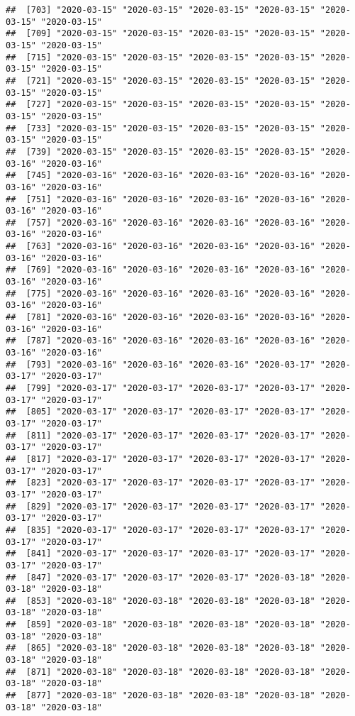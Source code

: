 \documentclass{article}\usepackage[]{graphicx}\usepackage[]{xcolor}
\makeatletter
\newenvironment{kframe}{%
 \def\at@end@of@kframe{}%
 \ifinner\ifhmode%
  \def\at@end@of@kframe{\end{minipage}}%
  \begin{minipage}{\columnwidth}%
 \fi\fi%
 \def\FrameCommand##1{\hskip\@totalleftmargin \hskip-\fboxsep
 \colorbox{shadecolor}{##1}\hskip-\fboxsep
     \hskip-\linewidth \hskip-\@totalleftmargin \hskip\columnwidth}%
 \MakeFramed {\advance\hsize-\width
   \@totalleftmargin\z@ \linewidth\hsize
   \@setminipage}}%
 {\par\unskip\endMakeFramed%
 \at@end@of@kframe}
\newenvironment{knitrout}{}{} %
\makeatother
\begin{document}
\begin{knitrout}
\begin{kframe}
\begin{verbatim}
##  [703] "2020-03-15" "2020-03-15" "2020-03-15" "2020-03-15" "2020-03-15" "2020-03-15"
##  [709] "2020-03-15" "2020-03-15" "2020-03-15" "2020-03-15" "2020-03-15" "2020-03-15"
##  [715] "2020-03-15" "2020-03-15" "2020-03-15" "2020-03-15" "2020-03-15" "2020-03-15"
##  [721] "2020-03-15" "2020-03-15" "2020-03-15" "2020-03-15" "2020-03-15" "2020-03-15"
##  [727] "2020-03-15" "2020-03-15" "2020-03-15" "2020-03-15" "2020-03-15" "2020-03-15"
##  [733] "2020-03-15" "2020-03-15" "2020-03-15" "2020-03-15" "2020-03-15" "2020-03-15"
##  [739] "2020-03-15" "2020-03-15" "2020-03-15" "2020-03-15" "2020-03-16" "2020-03-16"
##  [745] "2020-03-16" "2020-03-16" "2020-03-16" "2020-03-16" "2020-03-16" "2020-03-16"
##  [751] "2020-03-16" "2020-03-16" "2020-03-16" "2020-03-16" "2020-03-16" "2020-03-16"
##  [757] "2020-03-16" "2020-03-16" "2020-03-16" "2020-03-16" "2020-03-16" "2020-03-16"
##  [763] "2020-03-16" "2020-03-16" "2020-03-16" "2020-03-16" "2020-03-16" "2020-03-16"
##  [769] "2020-03-16" "2020-03-16" "2020-03-16" "2020-03-16" "2020-03-16" "2020-03-16"
##  [775] "2020-03-16" "2020-03-16" "2020-03-16" "2020-03-16" "2020-03-16" "2020-03-16"
##  [781] "2020-03-16" "2020-03-16" "2020-03-16" "2020-03-16" "2020-03-16" "2020-03-16"
##  [787] "2020-03-16" "2020-03-16" "2020-03-16" "2020-03-16" "2020-03-16" "2020-03-16"
##  [793] "2020-03-16" "2020-03-16" "2020-03-16" "2020-03-17" "2020-03-17" "2020-03-17"
##  [799] "2020-03-17" "2020-03-17" "2020-03-17" "2020-03-17" "2020-03-17" "2020-03-17"
##  [805] "2020-03-17" "2020-03-17" "2020-03-17" "2020-03-17" "2020-03-17" "2020-03-17"
##  [811] "2020-03-17" "2020-03-17" "2020-03-17" "2020-03-17" "2020-03-17" "2020-03-17"
##  [817] "2020-03-17" "2020-03-17" "2020-03-17" "2020-03-17" "2020-03-17" "2020-03-17"
##  [823] "2020-03-17" "2020-03-17" "2020-03-17" "2020-03-17" "2020-03-17" "2020-03-17"
##  [829] "2020-03-17" "2020-03-17" "2020-03-17" "2020-03-17" "2020-03-17" "2020-03-17"
##  [835] "2020-03-17" "2020-03-17" "2020-03-17" "2020-03-17" "2020-03-17" "2020-03-17"
##  [841] "2020-03-17" "2020-03-17" "2020-03-17" "2020-03-17" "2020-03-17" "2020-03-17"
##  [847] "2020-03-17" "2020-03-17" "2020-03-17" "2020-03-18" "2020-03-18" "2020-03-18"
##  [853] "2020-03-18" "2020-03-18" "2020-03-18" "2020-03-18" "2020-03-18" "2020-03-18"
##  [859] "2020-03-18" "2020-03-18" "2020-03-18" "2020-03-18" "2020-03-18" "2020-03-18"
##  [865] "2020-03-18" "2020-03-18" "2020-03-18" "2020-03-18" "2020-03-18" "2020-03-18"
##  [871] "2020-03-18" "2020-03-18" "2020-03-18" "2020-03-18" "2020-03-18" "2020-03-18"
##  [877] "2020-03-18" "2020-03-18" "2020-03-18" "2020-03-18" "2020-03-18" "2020-03-18"

\end{verbatim}
\end{kframe}
\end{knitrout}
\end{document}
